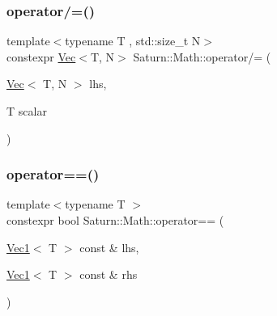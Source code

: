 \mbox{\label{namespace_saturn_1_1_math_a5657fe24dc197733f92e850e43a7ca43}} 
\subsubsection{\texorpdfstring{operator/=()}{operator/=()}}
{\footnotesize\ttfamily template$<$typename T , std\+::size\+\_\+t N$>$ \\
constexpr \mbox{\hyperlink{class_saturn_1_1_math_1_1_vec}{Vec}}$<$T, N$>$ Saturn\+::\+Math\+::operator/= (\begin{DoxyParamCaption}\item[{\mbox{\hyperlink{class_saturn_1_1_math_1_1_vec}{Vec}}$<$ T, N $>$}]{lhs,  }\item[{T}]{scalar }\end{DoxyParamCaption})}

\mbox{\label{namespace_saturn_1_1_math_a9476ffa60b25f7c48a8361e146bb0833}} 
\subsubsection{\texorpdfstring{operator==()}{operator==()}\hspace{0.1cm}{\footnotesize\ttfamily [1/4]}}
{\footnotesize\ttfamily template$<$typename T $>$ \\
constexpr bool Saturn\+::\+Math\+::operator== (\begin{DoxyParamCaption}\item[{\mbox{\hyperlink{namespace_saturn_1_1_math_acae4f808f0c3284d0b60ee1ac720deaa}{Vec1}}$<$ T $>$ const \&}]{lhs,  }\item[{\mbox{\hyperlink{namespace_saturn_1_1_math_acae4f808f0c3284d0b60ee1ac720deaa}{Vec1}}$<$ T $>$ const \&}]{rhs }\end{DoxyParamCaption})}

\mbox{\label{namespace_saturn_1_1_math_ade75807d0c4b3701a90134b551403ce4}} 
